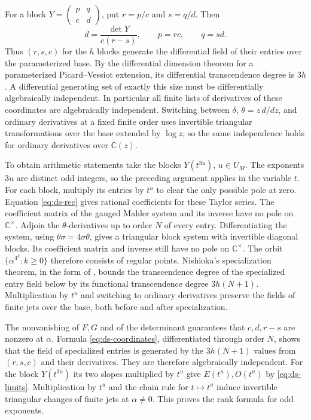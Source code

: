 \documentclass[11pt,a4paper]{article}
\theoremstyle{definition}
\theoremstyle{remark}
\numberwithin{equation}{section}
\begin{document}
For a block \(Y=\left(\begin{smallmatrix}p&q\\ c&d\end{smallmatrix}\right)\), put \(r=p/c\) and \(s=q/d\). Then
\begin{equation}
  d=\frac{\det Y}{c(r-s)},\qquad p=rc,\qquad q=sd.
  \label{eq:ds-coordinates}
\end{equation}
Thus \((r,s,c)\) for the \(h\) blocks generate the differential field of their entries over the parameterized base. By the differential dimension theorem for a parameterized Picard--Vessiot extension, its differential transcendence degree is \(3h\). A differential generating set of exactly this size must be differentially algebraically independent. In particular all finite lists of derivatives of these coordinates are algebraically independent. Switching between \(\delta\), \(\theta=z\,d/dz\), and ordinary derivatives at a fixed finite order uses invertible triangular transformations over the base extended by \(\log z\), so the same independence holds for ordinary derivatives over \(\mathbb C(z)\).

To obtain arithmetic statements take the blocks \(Y(t^{3u})\), \(u\in U_M\). The exponents \(3u\) are distinct odd integers, so the preceding argument applies in the variable \(t\). For each block, multiply its entries by \(t^u\) to clear the only possible pole at zero. Equation \eqref{eq:ds-rec} gives rational coefficients for these Taylor series. The coefficient matrix of the gauged Mahler system and its inverse have no pole on \(\mathbb C^\times\). Adjoin the \(\theta\)-derivatives up to order \(N\) of every entry. Differentiating the system, using \(\theta\sigma=4\sigma\theta\), gives a triangular block system with invertible diagonal blocks. Its coefficient matrix and inverse still have no pole on \(\mathbb C^\times\). The orbit \(\{\alpha^{4^k}:k\geq0\}\) therefore consists of regular points. Nishioka's specialization theorem, in the form of \cite[Lemma 2.1]{dsbv15}, bounds the transcendence degree of the specialized entry field below by its functional transcendence degree \(3h(N+1)\). Multiplication by \(t^u\) and switching to ordinary derivatives preserve the fields of finite jets over the base, both before and after specialization.

The nonvanishing of \(F,G\) and of the determinant guarantees that \(c,d,r-s\) are nonzero at \(\alpha\). Formula \eqref{eq:ds-coordinates}, differentiated through order \(N\), shows that the field of specialized entries is generated by the \(3h(N+1)\) values from \((r,s,c)\) and their derivatives. They are therefore algebraically independent. For the block \(Y(t^{3u})\) its two slopes multiplied by \(t^u\) give \(E(t^u),O(t^u)\) by \eqref{eq:ds-limits}. Multiplication by \(t^u\) and the chain rule for \(t\mapsto t^u\) induce invertible triangular changes of finite jets at \(\alpha\ne0\). This proves the rank formula for odd exponents.
\end{document}
